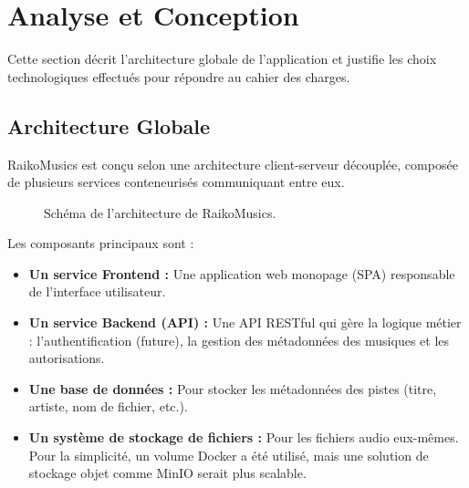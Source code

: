 \documentclass[12pt,a4paper]{article} %
\begin{document}
\section{Analyse et Conception}

Cette section décrit l'architecture globale de l'application et justifie les choix technologiques effectués pour répondre au cahier des charges.

\subsection{Architecture Globale}
RaikoMusics est conçu selon une architecture client-serveur découplée, composée de plusieurs services conteneurisés communiquant entre eux.

\begin{figure}[h!]
    \centering
    \caption{Schéma de l'architecture de RaikoMusics.}
    \label{fig:architecture}
\end{figure}

Les composants principaux sont :
\begin{itemize}
    \item \textbf{Un service Frontend :} Une application web monopage (SPA) responsable de l'interface utilisateur.
    \item \textbf{Un service Backend (API) :} Une API RESTful qui gère la logique métier : l'authentification (future), la gestion des métadonnées des musiques et les autorisations.
    \item \textbf{Une base de données :} Pour stocker les métadonnées des pistes (titre, artiste, nom de fichier, etc.).
    \item \textbf{Un système de stockage de fichiers :} Pour les fichiers audio eux-mêmes. Pour la simplicité, un volume Docker a été utilisé, mais une solution de stockage objet comme MinIO serait plus scalable.
\end{itemize}
\end{document}
